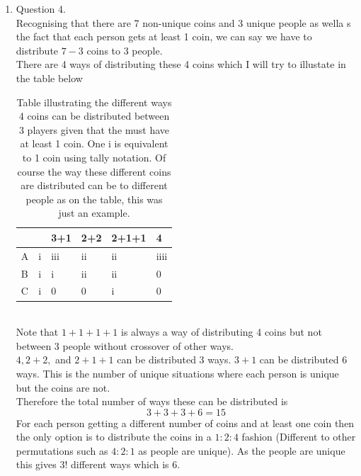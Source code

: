 \documentclass[12pt]{article}
\begin{document}
\begin{enumerate}
\item Question 4.
\\
Recognising that there are 7 non-unique coins and 3 unique people as wella s the fact that each person gets at least 1 coin, we can say we have to distribute $7-3$ coins to 3 people. 
\\
There are 4 ways of distributing these 4 coins which I will try to illustate in the table below
\\
\begin{table}[h]
     \centering
     \begin{tabular}{ll|l|l|l|l|}
     \cline{3-6}
                             &   & 3+1 & 2+2 & 2+1+1 & 4    \\ \hline
     \multicolumn{1}{|l|}{A} & i & iii & ii  & ii    & iiii \\ \hline
     \multicolumn{1}{|l|}{B} & i & i   & ii  & ii    & 0    \\ \hline
     \multicolumn{1}{|l|}{C} & i & 0   & 0   & i     & 0    \\ \hline
     \end{tabular}
     \caption{Table illustrating the different ways 4 coins can be distributed between 3 players given that the must have at least 1 coin. One i is equivalent to 1 coin using tally notation. Of course the way these different coins are distributed can be to different people as on the table, this was just an example.}
     \end{table}
\\
Note that $1+1+1+1$ is always a way of distributing 4 coins but not between 3 people without crossover of other ways. 
\\
$4, 2+2,$ and $2+1+1$ can be distributed 3 ways. $3+1$ can be distributed 6 ways. This is the number of unique situations where each person is unique but the coins are not. 
\\ 
Therefore the total number of ways these can be distributed is 
$$ 3+3+3+6 =15 $$
For each person getting a different number of coins and at least one coin then the only option is to distribute the coins in a $1:2:4$ fashion (Different to other permutations such as $4:2:1$ as people are unique). As the people are unique this gives $3!$ different ways which is 6. 


\end{enumerate}
\end{document}
